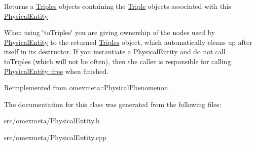 \begin{DoxyReturn}{Returns}
a \hyperlink{classomexmeta_1_1Triples}{Triples} objects containing the \hyperlink{classomexmeta_1_1Triple}{Triple} objects associated with this \hyperlink{classomexmeta_1_1PhysicalEntity}{Physical\+Entity}
\end{DoxyReturn}
When using \char`\"{}to\+Triples\char`\"{} you are giving ownership of the nodes used by \hyperlink{classomexmeta_1_1PhysicalEntity}{Physical\+Entity} to the returned \hyperlink{classomexmeta_1_1Triples}{Triples} object, which automatically cleans up after itself in its destructor. If you instantiate a \hyperlink{classomexmeta_1_1PhysicalEntity}{Physical\+Entity} and do not call to\+Triples (which will not be often), then the caller is responsible for calling \hyperlink{classomexmeta_1_1PhysicalEntity_a6fd4acd7255a01322c4a53d3e84df0ba}{Physical\+Entity\+::free} when finished. 

Reimplemented from \hyperlink{classomexmeta_1_1PhysicalPhenomenon_a30617e685bd8b155a76d38ab5a9db273}{omexmeta\+::\+Physical\+Phenomenon}.



The documentation for this class was generated from the following files\+:\begin{DoxyCompactItemize}
\item 
src/omexmeta/Physical\+Entity.\+h\item 
src/omexmeta/Physical\+Entity.\+cpp\end{DoxyCompactItemize}
